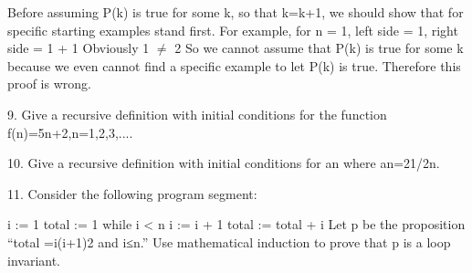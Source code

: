 \documentclass{article}
\begin{document}
\begin{large}
Before assuming P(k) is true for some k, so that k=k+1, we should show that for specific starting examples stand first.
For example, for n = 1, left side = 1, right side = 1 + 1
Obviously 1 $\neq$ 2
So we cannot assume that P(k) is true for some k because we even cannot find a specific example to let P(k) is true.
Therefore this proof is wrong.

9. Give a recursive definition with initial conditions for the function f(n)=5n+2,n=1,2,3,....

10. Give a recursive definition with initial conditions for {an} where an=21/2n.

11. Consider the following program segment:

i := 1
total := 1 
while i < n
  i := i + 1
  total := total + i
Let p be the proposition “total =i(i+1)2 and i≤n.” Use mathematical induction to prove that p is a loop invariant.

\end{large}
\end{document}
